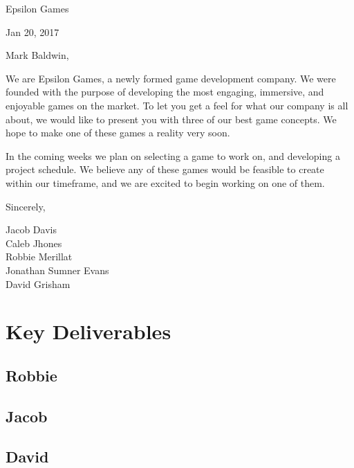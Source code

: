 \documentclass[12pt]{article}
\newcommand\tab[1][.5in]{\hspace*{#1}}
\begin{document}

\hfill Epsilon Games

\hfill Jan 20, 2017

Mark Baldwin,

We are Epsilon Games, a newly formed game development company. We were founded with the purpose of
developing the most engaging, immersive, and enjoyable games on the market. To let you get a feel
for what our company is all about, we would like to present you with three of our best game
concepts. We hope to make one of these games a reality very soon.

In the coming weeks we plan on selecting a game to work on, and developing a project schedule. We
believe any of these games would be feasible to create within our timeframe, and we are excited to
begin working on one of them.

Sincerely,

\tab Jacob Davis \\
\tab Caleb Jhones \\
\tab Robbie Merillat \\
\tab Jonathan Sumner Evans \\
\tab David Grisham \\

\newpage
\section*{Key Deliverables}

\subsection*{Robbie}


\subsection*{Jacob}


\subsection*{David}
\end{document}
